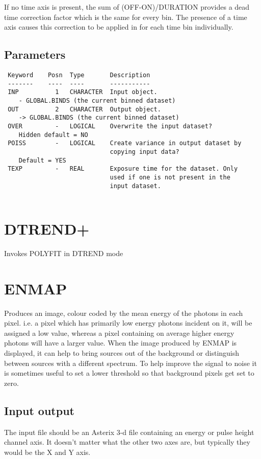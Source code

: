 \documentclass{book}
\renewcommand{\_}{{\tt\char'137}}     %
\begin{document}
If no time axis is present, the sum of (OFF-ON)/DURATION provides a
dead time correction factor which is the same for every bin. The
presence of a time axis causes this correction to be applied in for
each time bin individually.
 
\subsection{Parameters}
\begin{verbatim}
 Keyword    Posn  Type       Description
 -------    ----  ----       -----------
 INP          1   CHARACTER  Input object.
    - GLOBAL.BINDS (the current binned dataset)
 OUT          2   CHARACTER  Output object.
    -> GLOBAL.BINDS (the current binned dataset)
 OVER         -   LOGICAL    Overwrite the input dataset?
    Hidden default = NO
 POISS        -   LOGICAL    Create variance in output dataset by
                             copying input data?
    Default = YES
 TEXP         -   REAL       Exposure time for the dataset. Only
                             used if one is not present in the
                             input dataset.
 
\end{verbatim}\section{DTREND+}
Invokes POLYFIT in DTREND mode
\section{ENMAP}
Produces an image, colour coded by the mean energy of the photons
in each pixel. i.e. a pixel which has primarily low energy photons
incident on it, will be assigned a low value, whereas a pixel containing
on average higher energy photons will have a larger value. When the
image produced by ENMAP is displayed, it can help to bring sources
out of the background or distinguish between sources with a different
spectrum. To help improve the signal to noise it is sometimes useful
to set a lower threshold so that background pixels get set to zero.
 
\subsection{Input output}
The input file should be an Asterix 3-d file containing an energy
or pulse height channel axis. It doesn't matter what the other two axes
are, but typically they would be the X and Y axis.
 
\end{document}
